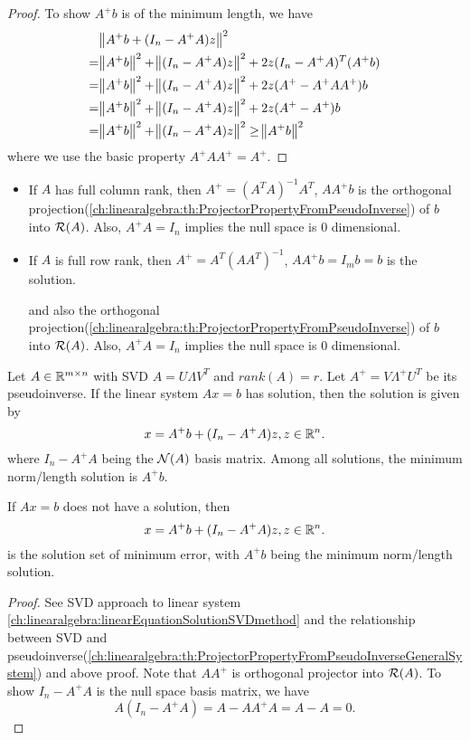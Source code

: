 \begin{refsection}
\begin{proof}
To show $A^+b$ is of the minimum length, we have
\begin{align*}
&\norm{A^+b + (I_n - A^+A)z}^2\\
=& \norm{A^+b}^2+\norm{(I_n - A^+A)z}^2+2z(I_n - A^+A)^T(A^+b)\\
=& \norm{A^+b}^2+\norm{(I_n - A^+A)z}^2+2z(A^+ - A^+AA^+)b\\
=& \norm{A^+b}^2+\norm{(I_n - A^+A)z}^2+2z(A^+ - A^+)b\\
=& \norm{A^+b}^2+\norm{(I_n - A^+A)z}^2
 \geq \norm{A^+b}^2
\end{align*}
where we use the basic property $A^+AA^+=A^+. $
\end{proof}


\begin{remark}[interpretation]\hfill
\begin{itemize}
	\item If $A$ has full column rank, then $A^+ = (A^TA)^{-1}A^T$, $AA^+b$ is the orthogonal projection(\autoref{ch:linearalgebra:th:ProjectorPropertyFromPseudoInverse}) of $b$ into $\mathcal{R}(A)$. Also, $A^+A =I_n$ implies the null space is 0 dimensional.
	\item If $A$ is full row rank, then $A^+ = A^T(AA^T)^{-1}$, $AA^+b = I_mb = b$ is the solution. 
	
	 and also the orthogonal projection(\autoref{ch:linearalgebra:th:ProjectorPropertyFromPseudoInverse}) of $b$ into $\mathcal{R}(A)$. Also, $A^+A =I_n$ implies the null space is 0 dimensional.	
\end{itemize}	
	
\end{remark}



\begin{theorem}\label{ch:linearalgebra:th:solutionForGeneralLinearSystemPseudoinverseMethod}
	Let $A \in \mathbb{R}^{m\times n}$ with SVD $A = U\Lambda V^T$ and $rank(A) = r$. Let $A^+  = V \Lambda^+ U^T$ be its pseudoinverse. If the linear system $Ax = b$ has solution, then the solution is given by
	$$x = A^+b + (I_n - A^+A)z, z\in \mathbb{R}^n.$$
	where $I_n - A^+A$ being the $\mathcal{N}(A)$ basis matrix.
	Among all solutions, the minimum norm/length solution is $A^+b$.
	
	If $Ax = b$ does not have a solution, then
	$$x = A^+b + (I_n - A^+A)z, z\in \mathbb{R}^n.$$
	is the solution set of minimum error, with $A^+b$ being the minimum norm/length solution.
\end{theorem}
\begin{proof}
	See SVD approach to linear system \autoref{ch:linearalgebra:linearEquationSolutionSVDmethod} and the relationship between SVD and pseudoinverse(\autoref{ch:linearalgebra:th:ProjectorPropertyFromPseudoInverseGeneralSystem}) and above proof.
	Note that $AA^+$ is orthogonal projector into $\mathcal{R}(A)$. To show  $I_n - A^+A$ is the null space basis matrix, we have
	$$A(I_n - A^+A) = A - AA^+A = A - A = 0.$$
\end{proof}



\end{refsection}

